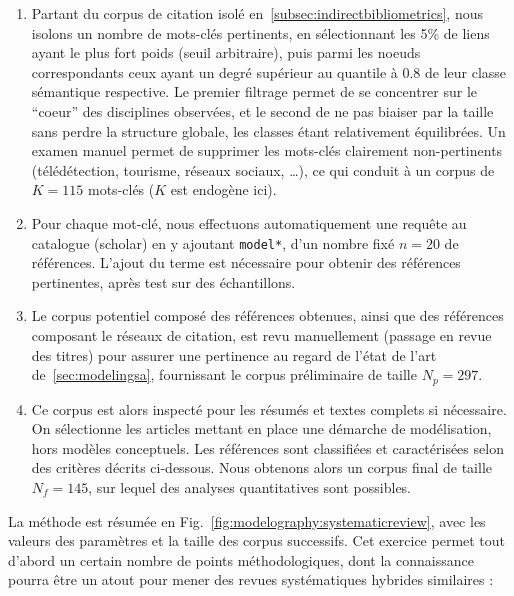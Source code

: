 \begin{enumerate}
\item Partant du corpus de citation isolé en~\ref{subsec:indirectbibliometrics}, nous isolons un nombre de mots-clés pertinents, en sélectionnant les 5\% de liens ayant le plus fort poids (seuil arbitraire), puis parmi les noeuds correspondants ceux ayant un degré supérieur au quantile à 0.8 de leur classe sémantique respective. Le premier filtrage permet de se concentrer sur le ``coeur'' des disciplines observées, et le second de ne pas biaiser par la taille sans perdre la structure globale, les classes étant relativement équilibrées. Un examen manuel permet de supprimer les mots-clés clairement non-pertinents (télédétection, tourisme, réseaux sociaux, \ldots), ce qui conduit à un corpus de $K=115$ mots-clés ($K$ est endogène ici).
\item Pour chaque mot-clé, nous effectuons automatiquement une requête au catalogue (scholar) en y ajoutant \texttt{model*}, d'un nombre fixé $n=20$ de références. L'ajout du terme est nécessaire pour obtenir des références pertinentes, après test sur des échantillons.
\item Le corpus potentiel composé des références obtenues, ainsi que des références composant le réseaux de citation, est revu manuellement (passage en revue des titres) pour assurer une pertinence au regard de l'état de l'art de~\ref{sec:modelingsa}, fournissant le corpus préliminaire de taille $N_p = 297$.
\item Ce corpus est alors inspecté pour les résumés et textes complets si nécessaire. On sélectionne les articles mettant en place une démarche de modélisation, hors modèles conceptuels. Les références sont classifiées et caractérisées selon des critères décrits ci-dessous. Nous obtenons alors un corpus final de taille $N_f = 145$, sur lequel des analyses quantitatives sont possibles.
\end{enumerate}

La méthode est résumée en Fig.~\ref{fig:modelography:systematicreview}, avec les valeurs des paramètres et la taille des corpus successifs. Cet exercice permet tout d'abord un certain nombre de points méthodologiques, dont la connaissance pourra être un atout pour mener des revues systématiques hybrides similaires :

